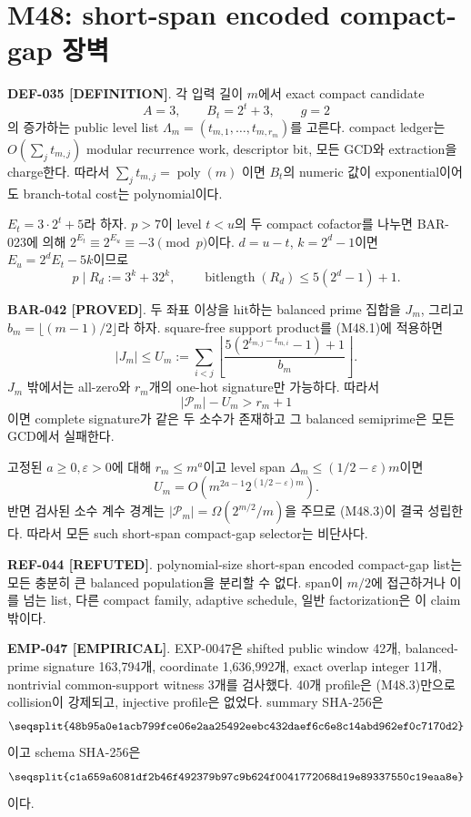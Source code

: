 \documentclass[11pt]{article}
\newcommand{\claimstatus}[2]{\textbf{#1 [#2]}}
\begin{document}
\section{M48: short-span encoded compact-gap 장벽}

\claimstatus{DEF-035}{DEFINITION}.
각 입력 길이 \(m\)에서 exact compact candidate
\[
A=3,\qquad B_t=2^t+3,\qquad g=2
\]
의 증가하는 public level list
\(\Lambda_m=(t_{m,1},\ldots,t_{m,r_m})\)를 고른다. compact ledger는
\(O(\sum_jt_{m,j})\) modular recurrence work, descriptor bit, 모든 GCD와
extraction을 charge한다. 따라서 \(\sum_jt_{m,j}=\operatorname{poly}(m)\)
이면 \(B_t\)의 numeric 값이 exponential이어도 branch-total cost는
polynomial이다.

\(E_t=3\cdot2^t+5\)라 하자. \(p>7\)이 level \(t<u\)의 두 compact
cofactor를 나누면 BAR-023에 의해
\(2^{E_t}\equiv2^{E_u}\equiv-3\pmod p\)이다. \(d=u-t\),
\(k=2^d-1\)이면 \(E_u=2^dE_t-5k\)이므로
\[
p\mid R_d:=3^k+32^k,\qquad
\operatorname{bitlength}(R_d)\le5(2^d-1)+1.
\tag{M48.1}
\]

\claimstatus{BAR-042}{PROVED}.
두 좌표 이상을 hit하는 balanced prime 집합을 \(J_m\), 그리고
\(b_m=\lfloor(m-1)/2\rfloor\)라 하자. square-free support product를
(M48.1)에 적용하면
\[
|J_m|\le U_m:=
\sum_{i<j}
\left\lfloor
\frac{5(2^{t_{m,j}-t_{m,i}}-1)+1}{b_m}
\right\rfloor.
\tag{M48.2}
\]
\(J_m\) 밖에서는 all-zero와 \(r_m\)개의 one-hot signature만 가능하다.
따라서
\[
|\mathcal P_m|-U_m>r_m+1
\tag{M48.3}
\]
이면 complete signature가 같은 두 소수가 존재하고 그 balanced
semiprime은 모든 GCD에서 실패한다.

고정된 \(a\ge0,\varepsilon>0\)에 대해
\(r_m\le m^a\)이고 level span
\(\Delta_m\le(1/2-\varepsilon)m\)이면
\[
U_m=O\!\left(m^{2a-1}2^{(1/2-\varepsilon)m}\right).
\]
반면 검사된 소수 계수 경계는
\(|\mathcal P_m|=\Omega(2^{m/2}/m)\)을 주므로 (M48.3)이 결국 성립한다.
따라서 모든 such short-span compact-gap selector는 비단사다.

\claimstatus{REF-044}{REFUTED}.
polynomial-size short-span encoded compact-gap list는 모든 충분히 큰
balanced population을 분리할 수 없다. span이 \(m/2\)에 접근하거나
이를 넘는 list, 다른 compact family, adaptive schedule, 일반
factorization은 이 claim 밖이다.

\claimstatus{EMP-047}{EMPIRICAL}.
EXP-0047은 shifted public window 42개, balanced-prime signature
163,794개, coordinate 1,636,992개, exact overlap integer 11개, nontrivial
common-support witness 3개를 검사했다. 40개 profile은 (M48.3)만으로
collision이 강제되고, injective profile은 없었다. summary SHA-256은
\[
\texttt{\seqsplit{48b95a0e1acb799fce06e2aa25492eebc432daef6c6e8c14abd962ef0c7170d2}}
\]
이고 schema SHA-256은
\[
\texttt{\seqsplit{c1a659a6081df2b46f492379b97c9b624f0041772068d19e89337550c19eaa8e}}
\]
이다.
\end{document}
